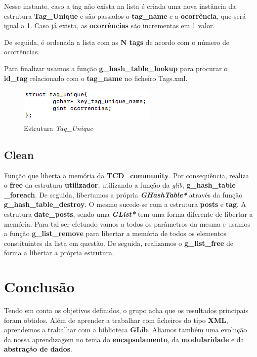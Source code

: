 \documentclass[a4paper]{article}
\begin{document}
Nesse instante, caso a tag não exista na lista é criada uma nova instância
da estrutura \textbf{Tag\_Unique} e são passados o \textbf{tag\_name} e
a \textbf{ocorrência}, que será igual a 1. Caso já exista, as 
\textbf{ocorrências} são incrementas em 1 valor.

De seguida, é ordenada a lista com as \textbf{N tags} de acordo com o
número de ocorrências. 

Para finalizar usamos a função \textbf{g\_hash\_table\_lookup} para procurar
o \textbf{id\_tag} relacionado com o \textbf{tag\_name} no ficheiro Tags.xml.

\begin{figure}[H]
\centering
\includegraphics[scale=0.70]{image_tag_unique}
\caption{Estrutura \textit{Tag\_Unique}}
\label{img:tag_unique}
\end{figure}

\subsection{Clean}

Função que liberta a memória da \textbf{TCD\_community}. Por consequência,
realiza o \textbf{free} da estrutura \textbf{utilizador}, utilizando a 
função da \textit{glib}, \textbf{g\_hash\_table} \textbf{\_foreach}. 
De seguida, libertamos a própria \textit{\textbf{GHashTable*}} através da 
função \textbf{g\_hash\_table\_destroy}. O mesmo sucede-se com a estrutura
\textbf{posts} e \textbf{tag}. A estrutura \textbf{date\_posts}, sendo
uma \textit{\textbf{GList*}} tem uma forma diferente de libertar a 
memória. Para tal ser efetuado vamos a todos os parâmetros da mesma
e usamos a função \textbf{g\_list\_remove} para libertar a memória
de todos os elementos constituintes da lista em questão. De seguida,
realizamos o \textbf{g\_list\_free} de forma a libertar a própria 
estrutura.

\section{Conclusão}
\label{sec:conclusao}

Tendo em conta os objetivos definidos, o grupo acha que os resultados 
principais foram obtidos. Além de aprender a trabalhar com ficheiros 
do tipo \textbf{XML}, aprendemos a trabalhar com a biblioteca \textbf{GLib}.
Aliamos também uma evolução da nossa aprendizagem no tema do 
\textbf{encapsulamento}, da \textbf{modularidade} e 
da \textbf{abstração de dados}.
\end{document}
